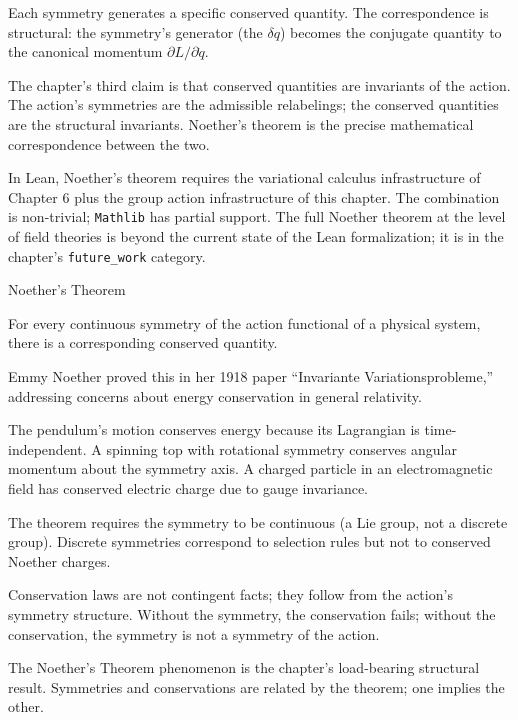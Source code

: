 Each symmetry generates a specific conserved quantity. The
correspondence is structural: the symmetry's generator (the
$\delta q$) becomes the conjugate quantity to the canonical momentum
$\partial L / \partial \dot{q}$.

The chapter's third claim is that conserved quantities are
invariants of the action. The action's symmetries are the
admissible relabelings; the conserved quantities are the
structural invariants. Noether's theorem is the precise
mathematical correspondence between the two.

In Lean, Noether's theorem requires the variational calculus
infrastructure of Chapter 6 plus the group action infrastructure
of this chapter. The combination is non-trivial; \texttt{Mathlib}
has partial support. The full Noether theorem at the level of
field theories is beyond the current state of the Lean
formalization; it is in the chapter's
\texttt{future\_work} category.

\begin{phenom}{Noether's Theorem}
\label{ph:noethers-theorem}

\PhStatement For every continuous symmetry of the action functional
of a physical system, there is a corresponding conserved quantity.

\PhOrigin Emmy Noether proved this in her 1918 paper ``Invariante
Variationsprobleme,'' addressing concerns about energy conservation
in general relativity.

\PhObservation The pendulum's motion conserves energy because its
Lagrangian is time-independent. A spinning top with rotational
symmetry conserves angular momentum about the symmetry axis. A
charged particle in an electromagnetic field has conserved electric
charge due to gauge invariance.

\PhConstraint The theorem requires the symmetry to be continuous
(a Lie group, not a discrete group). Discrete symmetries
correspond to selection rules but not to conserved Noether
charges.

\PhConsequence Conservation laws are not contingent facts; they
follow from the action's symmetry structure. Without the
symmetry, the conservation fails; without the conservation, the
symmetry is not a symmetry of the action.

\end{phenom}

The Noether's Theorem phenomenon is the chapter's load-bearing
structural result. Symmetries and conservations are related by
the theorem; one implies the other.

